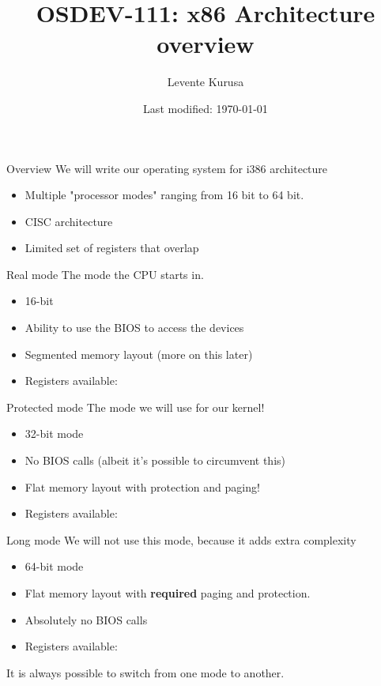 \documentclass{beamer}
\title{OSDEV-111: x86 Architecture overview}
\author{Levente Kurusa}
\institute{lkurusa@acm.org}
\date{Last modified: \today}
\begin{document}
\maketitle

\begin{frame}{Overview}
We will write our operating system for i386 architecture
\begin{itemize}
    \item Multiple "processor modes" ranging from 16 bit to 64 bit.
    \item CISC architecture
    \item Limited set of registers that overlap
\end{itemize}
\end{frame}

\begin{frame}{Real mode}
The mode the CPU starts in.
\begin{itemize}
    \item 16-bit
    \item Ability to use the BIOS to access the devices
    \item Segmented memory layout (more on this later)
    \item Registers available:
\end{itemize}
\end{frame}

\begin{frame}{Protected mode}
The mode we will use for our kernel!
\begin{itemize}
    \item 32-bit mode
    \item No BIOS calls (albeit it's possible to circumvent this)
    \item Flat memory layout with protection and paging!
    \item Registers available:
\end{itemize}
\end{frame}

\begin{frame}{Long mode}
We will not use this mode, because it adds extra complexity
\begin{itemize}
    \item 64-bit mode
    \item Flat memory layout with \textbf{required} paging and protection.
    \item Absolutely no BIOS calls
    \item Registers available:
\end{itemize}
\end{frame}

\begin{frame}
It is always possible to switch from one mode to another.
\end{frame}
\end{document}
